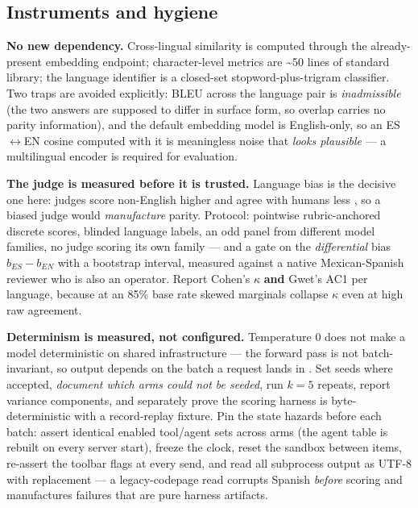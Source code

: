 \subsection{Instruments and hygiene}
\label{sec:instruments-and-hygiene}

\textbf{No new dependency.} Cross-lingual similarity is computed through the
already-present embedding endpoint; character-level metrics are
\textasciitilde{}50 lines of standard library; the language identifier is a closed-set
stopword-plus-trigram classifier. Two traps are avoided explicitly: BLEU across the
language pair is \emph{inadmissible} (the two answers are supposed to differ in surface
form, so overlap carries no parity information), and the default embedding model is
English-only, so an ES$\leftrightarrow$EN cosine computed with it is meaningless noise
that \emph{looks plausible} --- a multilingual encoder is required for evaluation.

\textbf{The judge is measured before it is trusted.} Language bias is the decisive one
here: judges score non-English higher and agree with humans less \citep{hada2024}, so a
biased judge would \emph{manufacture} parity. Protocol: pointwise rubric-anchored
discrete scores, blinded language labels, an odd panel from different model families,
no judge scoring its own family --- and a gate on the \emph{differential} bias
$b_{ES} - b_{EN}$ with a bootstrap interval, measured against a native Mexican-Spanish
reviewer who is also an operator. Report Cohen's $\kappa$ \textbf{and} Gwet's AC1 per
language, because at an 85\% base rate skewed marginals collapse $\kappa$ even at high
raw agreement.

\textbf{Determinism is measured, not configured.} Temperature 0 does not make a model
deterministic on shared infrastructure --- the forward pass is not batch-invariant, so
output depends on the batch a request lands in \citep{he2025_nondeterminism}. Set seeds
where accepted, \emph{document which arms could not be seeded}, run $k=5$ repeats,
report variance components, and separately prove the scoring harness is
byte-deterministic with a record-replay fixture. Pin the state hazards before each
batch: assert identical enabled tool/agent sets across arms (the agent table is rebuilt
on every server start), freeze the clock, reset the sandbox between items, re-assert the
toolbar flags at every send, and read all subprocess output as UTF-8 with replacement
--- a legacy-codepage read corrupts Spanish \emph{before} scoring and manufactures
failures that are pure harness artifacts.

